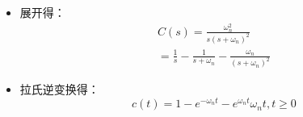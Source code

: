 \begin{frame}
\begin{block}{}
\begin{itemize}
\item<+-> 展开得：
\begin{eqnarray*}
C(s)=\frac{\omega_n^2}{s(s+\omega_n)^2}\\
=\frac{1}{s}-\frac{1}{s+\omega_n}-\frac{\omega_n}{(s+\omega_n)^2}
\end{eqnarray*} 
\item<+-> 拉氏逆变换得：
\[c(t)=1-e^{-\omega_nt}-e^{\omega_nt}\omega_nt,t\geq 0\]
\end{itemize}
\end{block}
\end{frame}
\endinput